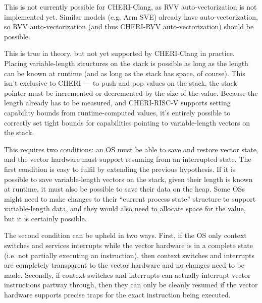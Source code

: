 This is not currently possible for CHERI-Clang, as RVV auto-vectorization is not implemented yet.
Similar models (e.g. Arm SVE) already have auto-vectorization, so RVV auto-vectorization (and thus CHERI-RVV auto-vectorization) should be possible.

This is true in theory, but not yet supported by CHERI-Clang in practice.
Placing variable-length structures on the stack is possible as long as the length can be known at runtime (and as long as the stack has space, of course).
This isn't exclusive to CHERI --- to push and pop values on the stack, the stack pointer must be incremented or decremented by the size of the value.
Because the length already has to be measured, and CHERI-RISC-V supports setting capability bounds from runtime-computed values, it's entirely possible to correctly set tight bounds for capabilities pointing to variable-length vectors on the stack.

This requires two conditions: an OS must be able to save and restore vector state, and the vector hardware must support resuming from an interrupted state.
The first condition is easy to fulfil by extending the previous hypothesis. 
If it is possible to save variable-length vectors on the stack, given their length is known at runtime, it must also be possible to save their data on the heap.
Some OSs might need to make changes to their ``current process state'' structure to support variable-length data, and they would also need to allocate space for the  value, but it is certainly possible.

The second condition can be upheld in two ways.
First, if the OS only context switches and services interrupts while the vector hardware is in a complete state (i.e. not partially executing an instruction), then context switches and interrupts are completely transparent to the vector hardware and no changes need to be made.
Secondly, if context switches and interrupts can actually interrupt vector instructions partway through, then they can only be cleanly resumed if the vector hardware supports precise traps for the exact instruction being executed.